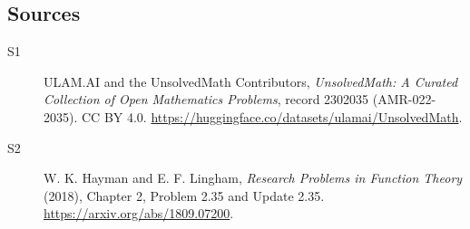 \documentclass[11pt]{article}
\begin{document}
\subsection{Sources}
\begin{description}
\item[\hypertarget{source:2302035:1}{S1}] ULAM.AI and the UnsolvedMath Contributors, \emph{UnsolvedMath: A Curated Collection of Open Mathematics Problems}, record 2302035 (AMR-022-2035). CC BY 4.0. \url{https://huggingface.co/datasets/ulamai/UnsolvedMath}.
\item[\hypertarget{source:2302035:2}{S2}] W. K. Hayman and E. F. Lingham, \emph{Research Problems in Function Theory} (2018), Chapter 2, Problem 2.35 and Update 2.35. \url{https://arxiv.org/abs/1809.07200}.
\end{description}
\label{end:2302035}
\end{document}
